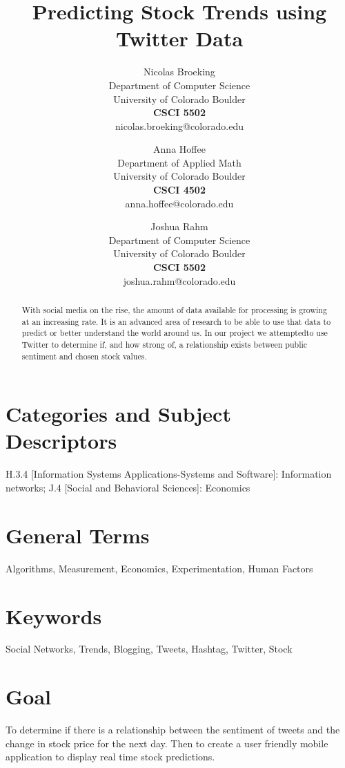 \documentclass{acm_proc_article-sp}
\title{Predicting Stock Trends using Twitter Data}
\author{
    Nicolas Broeking \\
    \small Department of Computer Science \\
    \small University of Colorado Boulder \\
    \small \textbf{CSCI 5502} \\
    \small nicolas.broeking@colorado.edu \\
    \and
    Anna Hoffee \\
    \small Department of Applied Math \\
    \small University of Colorado Boulder \\
    \small \textbf{CSCI 4502} \\
    \small anna.hoffee@colorado.edu \\
    \and
    Joshua Rahm \\
    \small Department of Computer Science \\
    \small University of Colorado Boulder \\
    \small \textbf{CSCI 5502} \\
    \small joshua.rahm@colorado.edu \\
}
\begin{document}

\maketitle

\begin{abstract}
With social media on the rise, the amount of data available for processing is
growing at an increasing rate. It is an advanced area of research to be able to
use that data to predict or better understand the world around us. In our
project we attemptedto use Twitter to determine if, and how strong of, a
relationship exists between public sentiment and chosen stock values.

\end{abstract}

\section*{Categories and Subject\\ Descriptors}

H.3.4 [Information Systems Applications-Systems and Software]: Information
networks; J.4 [Social and Behavioral Sciences]: Economics

\section*{General Terms}
Algorithms, Measurement, Economics, Experimentation, Human Factors

\section*{Keywords}

Social Networks, Trends, Blogging, Tweets, Hashtag, Twitter, Stock

\section*{Goal}

To determine if there is a relationship between the sentiment of tweets and the
change in stock price for the next day. Then to create a user friendly mobile
application to display real time stock predictions.
\end{document}
